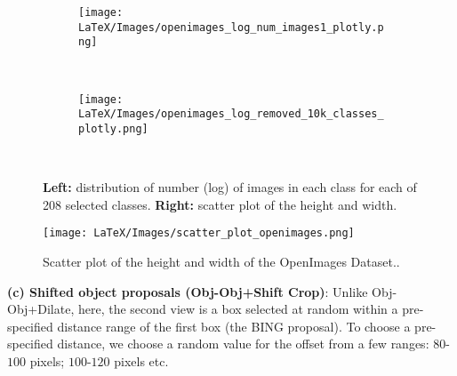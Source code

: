 \begin{figure*}[t!]
  \begin{subfigure}{0.5\textwidth}
   \centering
    \texttt{[image: LaTeX/Images/openimages\_log\_num\_images1\_plotly.png]}
    
    
  \end{subfigure}
  ~
  \begin{subfigure}{0.5\linewidth}
  \centering
    \texttt{[image: LaTeX/Images/openimages\_log\_removed\_10k\_classes\_plotly.png]}
   
    
  \end{subfigure}
  ~
    
    
  
  \caption{\textbf{Left:} distribution of number (log) of images in each class for each of 208 selected classes.  \textbf{Right:} scatter plot of the height and width.}
  \label{fig:openimages1_distribution}
  
\end{figure*}

\begin{figure}[t!]
\centering
    \texttt{[image: LaTeX/Images/scatter\_plot\_openimages.png]}
    \caption{ Scatter plot of the height and width of the OpenImages Dataset..}
\end{figure}





\textbf{(c) Shifted object proposals (Obj-Obj+Shift Crop)}: Unlike Obj-Obj+Dilate, here, the second view is a box selected at random within a pre-specified distance range of the first box (the BING proposal). To choose a pre-specified distance, we choose a random value for the offset from a few ranges: $80$-$100$ pixels; $100$-$120$ pixels etc. 


